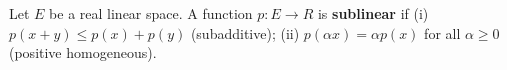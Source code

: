 Let $E$ be a real linear space. A function $p : E \to R$ is \textbf{sublinear} if (i) $p(x + y) \leq p(x) + p(y)$ (subadditive); (ii) $p(\alpha x) = \alpha p(x)$ for all $\alpha \geq 0$ (positive homogeneous).
